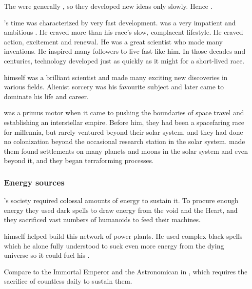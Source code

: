 The \ophidians were generally , so they developed new ideas only slowly. 
Hence .

\Sethicus's time was characterized by very fast development. 
\Sethicus was a very impatient and ambitious \ophidian.
He craved more than his race's slow, complacent lifestyle.
He craved action, excitement and renewal.
He was a great scientist who made many inventions.
He inspired many followers to live fast like him. 
In those decades and centuries, technology developed just as quickly as it might for a short-lived race.

\Sethicus himself was a brilliant scientist and made many exciting new discoveries in various fields. 
Alienist sorcery was his favourite subject and later came to dominate his life and career. 

\Sethicus was a primus motor when it came to pushing the boundaries of space travel and establishing an interstellar \ophidian empire. 
Before him, they had been a spacefaring race for millennia, but rarely ventured beyond their solar system, and they had done no colonization beyond the occasional research station in the solar system. 
\Sethicus made them found settlements on many planets and moons in the solar system and even beyond it, and they began terraforming processes. 





\subsubsection{Energy sources}
\Sethicus's society required colossal amounts of energy to sustain it.
To procure enough energy they used dark spells to draw energy from the void and the Heart, and they sacrificed vast numbers of humanoids to feed their machines. 

\Sethicus himself helped build this network of power plants.
He used complex black spells which he alone fully understood to suck even more energy from the dying universe so it could fuel his . 

Compare to the Immortal Emperor and the Astronomican in \cite{RPG:Warhammer40000}, which requires the sacrifice of countless \humans daily to sustain them.









